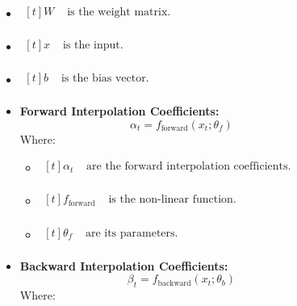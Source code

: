 \documentclass{ieeeojies}
\begin{document}
\begin{figure}[H]
\begin{minipage}{0.50\textwidth}
\begin{itemize}
\begin{itemize}
    \item $\begin{aligned}[t]
            W & \text{ is the weight matrix.} \\
            \end{aligned}$
    \item $\begin{aligned}[t]
            x & \text{ is the input.} \\
            \end{aligned}$
    \item $\begin{aligned}[t]
            b & \text{ is the bias vector.} \\
            \end{aligned}$
\end{itemize}
\end{itemize}
\begin{itemize}
    \item  \textbf{Forward Interpolation Coefficients:} 
\[
\alpha_t = f_{\text{forward}}(x_t; \theta_f)
\]
Where: 
\begin{itemize}
    \item $\begin{aligned}[t]
            \alpha_t & \text{ are the forward interpolation coefficients.} \\
            \end{aligned}$
    \item $\begin{aligned}[t]
            f_{\text{forward}} & \text{ is the non-linear function.} \\
            \end{aligned}$
    \item $\begin{aligned}[t]
            \theta_f & \text{ are its parameters.} \\
            \end{aligned}$
\end{itemize}
\end{itemize}
\begin{itemize}
    \item  \textbf{Backward Interpolation Coefficients:} 
\[
\beta_t = f_{\text{backward}}(x_t; \theta_b)
\]
Where: 
\end{itemize}
\end{minipage}
\end{figure}
\end{document}
